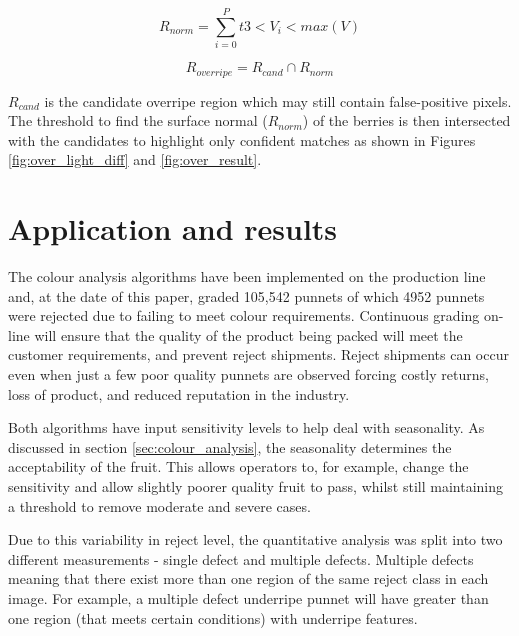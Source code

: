 \documentclass[conference]{IEEEtran}
\begin{document}
\begin{equation}
R_{norm} = \sum_{i=0}^{P}t3<V_i<max(V)
\label{berry_tops}
\end{equation}

\begin{equation}
R_{overripe} = R_{cand} \cap R_{norm}
\label{intersect_dark_berry}
\end{equation}

$R_{cand}$ is the candidate overripe region which may still contain false-positive pixels. The threshold to find the surface normal ($R_{norm}$) of the berries is then intersected with the candidates to highlight only confident matches as shown in Figures \ref{fig:over_light_diff} and \ref{fig:over_result}.






\section{Application and results}


The colour analysis algorithms have been implemented on the production line and, at the date of this paper, graded 105,542 punnets of which 4952 punnets were rejected due to failing to meet colour requirements. Continuous grading on-line will ensure that the quality of the product being packed will meet the customer requirements, and prevent reject shipments. Reject shipments can occur even when just a few poor quality punnets are observed forcing costly returns, loss of product, and reduced reputation in the industry.


Both algorithms have input sensitivity levels to help deal with seasonality. As discussed in section \ref{sec:colour_analysis}, the seasonality determines the acceptability of the fruit. This allows operators to, for example, change the sensitivity and allow slightly poorer quality fruit to pass, whilst still maintaining a threshold to remove moderate and severe cases.

Due to this variability in reject level, the quantitative analysis was split into two different measurements - single defect and multiple defects. Multiple defects meaning that there exist more than one region of the same reject class in each image. For example, a multiple defect underripe punnet will have greater than one region (that meets certain conditions) with underripe features.
\end{document}
